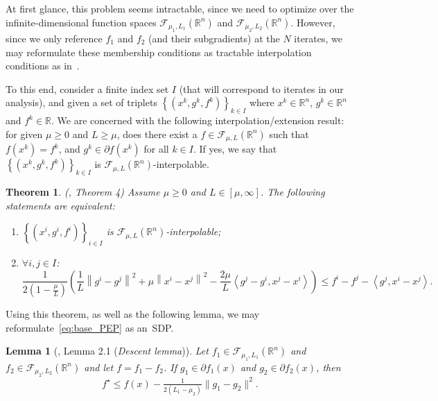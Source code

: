 \documentclass{article} %
\newtheorem{lemma}{Lemma}
\newtheorem{theorem}{Theorem}
\renewcommand{\leq}{\leqslant}
\begin{document}
At first glance, this problem seems intractable, since we need to optimize over the infinite-dimensional function spaces
$\mathcal{F}_{\mu_1,L_1}(\mathbb{R}^n)$ and $\mathcal{F}_{\mu_2,L_2}(\mathbb{R}^n)$. However, since we only reference $f_1$ and $f_2$ (and their subgradients) at the $N$ iterates, we may reformulate these membership conditions as tractable interpolation conditions as in~\cite{taylor2017smooth}.

To this end, consider a finite index set $I$ (that will correspond to iterates in our analysis), and given a set of triplets $\left\{(x^k,g^k,f^k) \right\}_{k\in I}$ where  $x^k \in \mathbb{R}^n$,
 $g^k\in \mathbb{R}^n$ and   $f^k\in \mathbb{R}$.
 We are concerned with the following interpolation/extension result: for given $\mu \ge 0$ and $L \ge \mu$, does there exist a $f\in\mathcal{F}_{\mu, L}(\mathbb{R}^n)$ such that
$f(x^k)=f^k$, and $g^k\in\partial f(x^k)$ for all $k\in I$. If yes, we say that $\left\{(x^k,g^k,f^k) \right\}_{k\in I}$  is $\mathcal{F}_{\mu, L}(\mathbb{R}^n)$-interpolable.


\begin{theorem}(\cite{taylor2017smooth}, Theorem 4)
Assume $\mu \ge 0$ and $L \in [\mu,\infty]$.
The following statements are equivalent:
\begin{enumerate}
\item
$\left\{(x^i,g^i,f^i) \right\}_{i\in I}$  is $\mathcal{F}_{\mu, L}(\mathbb{R}^n)$-interpolable;
\item
 $\forall i,j\in I$:
\begin{equation}
\label{fmuLinterpolation}
\frac{1}{2(1-\frac{\mu}{L})}\left(\frac{1}{L}\left\|g^i-g^j\right\|^2+\mu\left\|x^i-x^j\right\|^2-\frac{2\mu}{L}\left\langle g^j-g^i,x^j-x^i\right\rangle\right)\leq
f^i-f^j-\left\langle g^j, x^i-x^j\right\rangle.
\end{equation}
\end{enumerate}
\end{theorem}
Using this theorem, as well as the following lemma, we may reformulate~\eqref{eq:base_PEP} as an~SDP.

\begin{lemma}[\cite{abbaszad2024DCA}, Lemma 2.1 (\emph{Descent lemma})]\label{Lem_de}
 Let $f_1\in\mathcal{F}_{\mu_1, L_1}({\mathbb{R}^n})$ and $f_2\in\mathcal{F}_{\mu_2, L_2}({\mathbb{R}^n})$ and let $f=f_1-f_2$. If $g_1\in\partial f_1(x)$ and $g_2\in\partial f_2(x)$, then
 $$
 f^\star\leq f(x)-\tfrac{1}{2\left(L_1-\mu_2\right)}\|g_1-g_2\|^2.
 $$
\end{lemma}
\end{document}
